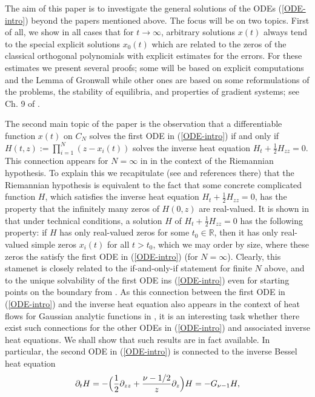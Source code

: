 \documentclass[reqno]{amsart}
\theoremstyle{plain}
\theoremstyle{definition}
\numberwithin{equation}{section}
\begin{document}
The aim of this paper is to investigate the general solutions of the ODEs (\ref{ODE-intro}) beyond the papers mentioned above.
The focus will be  on two topics. First of all, we  show in all  cases that for $t\to\infty$,
arbitrary solutions $x(t)$ always tend to the special explicit solutions 
$x_0(t)$ which are related to the zeros of the classical  orthogonal polynomials  with explicit estimates for the errors.
For these estimates we  present several proofs; some will be based  on explicit computations and the Lemma of Gronwall while other ones
are based on some reformulations of the problems, the stability of equilibria, and properties of gradient systems; see Ch. 9 of \cite{HS}.

The second main topic of the paper is the  observation that a differentiable function $x(t)$ on $C_N$
solves the first ODE in (\ref{ODE-intro})
      if and only if $H(t,z):=\prod_{i=1}^N (z-x_i(t))$
      solves the inverse heat equation $H_t+ \frac{1}{2}H_{zz}=0$.
      This connection appears for $N=\infty$  in \cite{CSL, RT} in the context of the Riemannian hypothesis. To explain this we recapitulate
(see \cite{CSL, RT} and references there) that  the Riemannian hypothesis is equivalent to the fact that some 
      concrete complicated function $H$, which satisfies the inverse heat equation $H_t+ \frac{1}{2}H_{zz}=0$, has the property
      that the infinitely many zeros of $H(0,z)$ are real-valued. It is shown in \cite{CSL} that under  technical conditions,
      a solution $H$ of $H_t+ \frac{1}{2}H_{zz}=0$ has the following property: if $H$ has only  real-valued zeros for some $t_0\in\mathbb R$, then it has
      only   real-valued simple  zeros $x_i(t)$ for all $t>t_0$, which we may order by size, where these zeros the satisfy the first ODE in (\ref{ODE-intro})
      (for $N=\infty$). Clearly, this stamenet is closely related to the if-and-only-if statement for finite $N$ above, and to the  unique solvability
      of the first ODE ins (\ref{ODE-intro}) even for starting points on the boundary from \cite{VW3}. As this connection between
      the first ODE in (\ref{ODE-intro}) and the  inverse heat equation also appears in the context of heat flows for Gaussian analytic functions
      in \cite{HHJK}, it is an interesting task whether there exist such connections for the other ODEs in  (\ref{ODE-intro}) and associated
       inverse heat equations. We shall show that such results are in fact available.  In particular,  the second  ODE in  (\ref{ODE-intro})
      is connected to the inverse Bessel heat 
 equation
       $$ \partial_tH = -\Bigl(\frac{1}{2}\partial_{zz}+ \frac{\nu-1/2}{z}\partial_z\Bigr)H=-G_{\nu-1}H,$$
\end{document}
